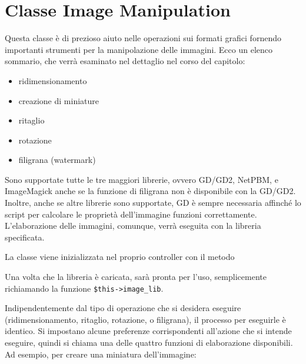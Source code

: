 \section{Classe Image Manipulation}
\label{class:image}

Questa classe è di prezioso aiuto nelle operazioni sui formati grafici fornendo importanti strumenti per la manipolazione delle immagini. Ecco un elenco sommario, che verrà esaminato nel dettaglio nel corso del capitolo:

\begin{itemize}
\item ridimensionamento
\item creazione di miniature
\item ritaglio 
\item rotazione
\item filigrana (watermark)
\end{itemize}

Sono supportate tutte le tre maggiori librerie, ovvero GD/GD2, NetPBM, e ImageMagick anche se la funzione di filigrana non è disponibile con la GD/GD2. Inoltre, anche se altre librerie sono supportate, GD è sempre necessaria affinché lo script per calcolare le proprietà dell'immagine funzioni correttamente. L'elaborazione delle immagini, comunque, verrà eseguita con la libreria specificata. 

La classe viene inizializzata nel proprio controller con il metodo 


Una volta che la libreria è caricata, sarà pronta per l'uso, semplicemente richiamando la funzione \verb|$this->image_lib|. 

Indipendentemente dal tipo di operazione che si desidera eseguire (ridimensionamento, ritaglio, rotazione, o filigrana), il processo per eseguirle è identico. Si impostano alcune preferenze corrispondenti all'azione che si intende eseguire, quindi si chiama una delle quattro funzioni di elaborazione disponibili. Ad esempio, per creare una miniatura dell'immagine:


